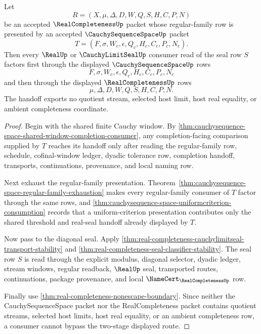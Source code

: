 \begin{theorem}
\label{thm:real-completeness-cauchysequence-space-shared-window-handoff}
Let
$$
R=(X,\mu,\Delta,D,W,Q,S,H,C,P,N)
$$
be an accepted $\RealCompletenessUp$ packet whose regular-family row is presented by an accepted $\CauchySequenceSpaceUp$ packet
$$
T=(F,\sigma,W_c,\epsilon,Q_c,H_c,C_c,P_c,N_c).
$$
Then every $\RealUp$ or $\CauchyLimitSealUp$ consumer read of the seal row $S$ factors first through the displayed $\CauchySequenceSpaceUp$ rows
$$
F,\sigma,W_c,\epsilon,Q_c,H_c,C_c,P_c,N_c
$$
and then through the displayed $\RealCompletenessUp$ rows
$$
\mu,\Delta,D,W,Q,S,H,C,P,N.
$$
The handoff exports no quotient stream, selected host limit, host real equality, or ambient completeness coordinate.
\end{theorem}
\begin{proof}
Begin with the shared finite Cauchy window. By \autoref{thm:cauchysequence-space-shared-window-completion-consumer}, any completion-facing comparison supplied by $T$ reaches its handoff only after reading the regular-family row, schedule, cofinal-window ledger, dyadic tolerance row, completion handoff, transports, continuations, provenance, and local naming row.

Next exhaust the regular-family presentation. Theorem~\ref{thm:cauchysequence-space-regular-family-exhaustion} makes every regular-family consumer of $T$ factor through the same rows, and \autoref{thm:cauchysequence-space-uniformcriterion-consumption} records that a uniform-criterion presentation contributes only the shared threshold and real-seal handoff already displayed by $T$.

Now pass to the diagonal seal. Apply \autoref{thm:real-completeness-cauchylimitseal-transport-stability} and \autoref{thm:real-completeness-seal-classifier-stability}. The seal row $S$ is read through the explicit modulus, diagonal selector, dyadic ledger, stream windows, regular readback, $\RealUp$ seal, transported routes, continuations, package provenance, and local $\NameCert_{\RealCompletenessUp}$ row.

Finally use \autoref{thm:real-completeness-nonescape-boundary}. Since neither the CauchySequenceSpace packet nor the RealCompleteness packet contains quotient streams, selected host limits, host real equality, or an ambient completeness row, a consumer cannot bypass the two-stage displayed route.
\end{proof}

